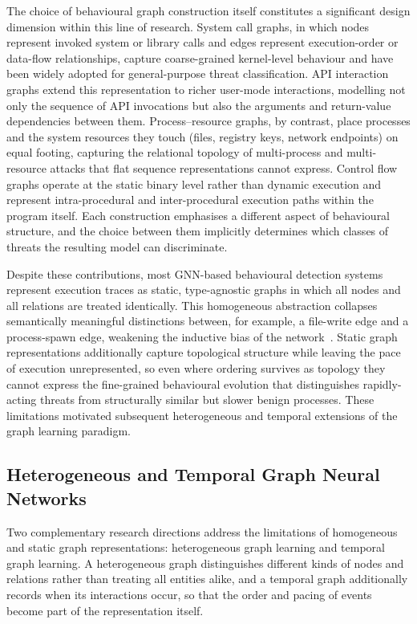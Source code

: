 \documentclass[%
    BCOR=10mm,
    DIV=13,
    toc=bibliography,
    toc=listof,
    oneside,
    12pt,
]{scrbook}
\begin{document}
The choice of behavioural graph construction itself constitutes a significant
design dimension within this line of research. System call graphs, in which
nodes represent invoked system or library calls and edges represent
execution-order or data-flow relationships, capture coarse-grained kernel-level
behaviour and have been widely adopted for general-purpose threat
classification. API interaction graphs extend this representation to richer
user-mode interactions, modelling not only the sequence of API invocations but
also the arguments and return-value dependencies between them.
Process--resource graphs, by contrast, place processes and the system resources
they touch (files, registry keys, network endpoints) on equal footing,
capturing the relational topology of multi-process and multi-resource attacks
that flat sequence representations cannot express. Control flow graphs operate
at the static binary level rather than dynamic execution and represent
intra-procedural and inter-procedural execution paths within the program
itself. Each construction emphasises a different aspect of behavioural
structure, and the choice between them implicitly determines which classes of
threats the resulting model can discriminate.

Despite these contributions, most GNN-based behavioural detection systems
represent execution traces as static, type-agnostic graphs in which all nodes
and all relations are treated identically. This homogeneous abstraction
collapses semantically meaningful distinctions between, for example, a
file-write edge and a process-spawn edge, weakening the inductive bias of the
network~\cite{bilot2024survey}. Static graph representations additionally
capture topological structure while leaving the pace of execution
unrepresented, so even where ordering survives as topology they cannot express
the fine-grained behavioural evolution that distinguishes rapidly-acting
threats from structurally similar but slower benign processes. These
limitations motivated subsequent heterogeneous and temporal extensions of the
graph learning paradigm.

\subsection{Heterogeneous and Temporal Graph Neural Networks}
\label{subsec:hetero_tgnn}

Two complementary research directions address the limitations of homogeneous
and static graph representations: heterogeneous graph learning and temporal
graph learning. A heterogeneous graph distinguishes different kinds of nodes
and relations rather than treating all entities alike, and a temporal graph
additionally records when its interactions occur, so that the order and
pacing of events become part of the representation itself.
\end{document}
